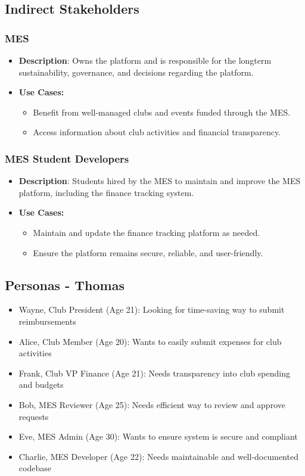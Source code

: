 \documentclass[12pt]{article}
\begin{document}
  \subsection{Indirect Stakeholders}
    \subsubsection{MES}
      \begin{itemize}
        \item \textbf{Description}: Owns the platform and is responsible for the longterm sustainability, governance, and decisions regarding the platform.
        \item \textbf{Use Cases:}
          \begin{itemize}
            \item Benefit from well-managed clubs and events funded through the MES.
            \item Access information about club activities and financial transparency.
          \end{itemize}
      \end{itemize}
    \subsubsection{MES Student Developers}
      \begin{itemize}
        \item \textbf{Description}: Students hired by the MES to maintain and improve the MES platform, including the finance tracking system.
        \item \textbf{Use Cases:}
          \begin{itemize}
            \item Maintain and update the finance tracking platform as needed.
            \item Ensure the platform remains secure, reliable, and user-friendly.
          \end{itemize}
      \end{itemize}

  \subsection{Personas - Thomas}
    \begin{itemize}
      \item Wayne, Club President (Age 21): Looking for time-saving way to submit reimbursements
      \item Alice, Club Member (Age 20): Wants to easily submit expenses for club activities
      \item Frank, Club VP Finance (Age 21): Needs transparency into club spending and budgets
      \item Bob, MES Reviewer (Age 25): Needs efficient way to review and approve requests
      \item Eve, MES Admin (Age 30): Wants to ensure system is secure and compliant
      \item Charlie, MES Developer (Age 22): Needs maintainable and well-documented codebase
    \end{itemize}
\end{document}
